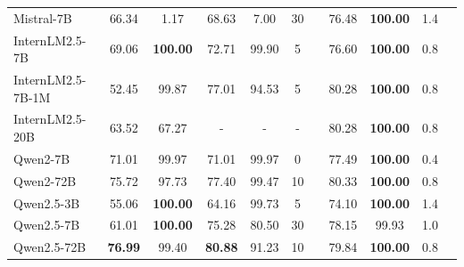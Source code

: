 \begin{table}[htbp]
{\begin{tabular}{lcccccccccc}
Mistral-7B & 66.34 & 1.17 & 68.63 & 7.00 & 30 & & 76.48 & \textbf{100.00} & 1.4 & \\
InternLM2.5-7B & 69.06 & \textbf{100.00} & 72.71 & 99.90 & 5 & & 76.60 & \textbf{100.00} & 0.8 & \\
InternLM2.5-7B-1M & 52.45 & 99.87 & 77.01 & 94.53 & 5 & & 80.28 & \textbf{100.00} & 0.8 & \\
InternLM2.5-20B & 63.52 & 67.27 & - & - & - & & 80.28 & \textbf{100.00} & 0.8 & \\
Qwen2-7B & 71.01 & 99.97 & 71.01 & 99.97 & 0 & & 77.49 & \textbf{100.00} & 0.4 & \\
Qwen2-72B & 75.72 & 97.73 & 77.40 & 99.47 & 10 & & 80.33 & \textbf{100.00} & 0.8 & \\
Qwen2.5-3B & 55.06 & \textbf{100.00} & 64.16 & 99.73 & 5 & & 74.10 & \textbf{100.00} & 1.4 & \\
Qwen2.5-7B & 61.01 & \textbf{100.00} & 75.28 & 80.50 & 30 & & 78.15 & 99.93 & 1.0 & \\
Qwen2.5-72B & \textbf{76.99} & 99.40 & \textbf{80.88} & 91.23 & 10 & & 79.84 & \textbf{100.00} & 0.8 & \\
\hline
\end{tabular}
}
\end{table}

